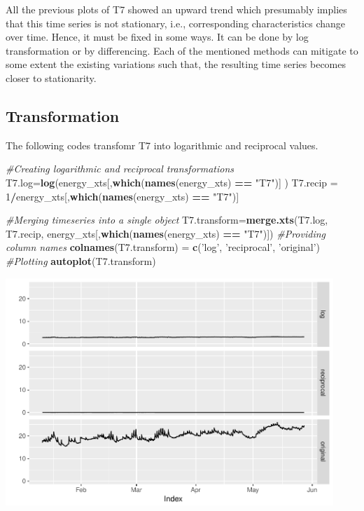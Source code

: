 \documentclass[]{article}
\newenvironment{Shaded}{\begin{snugshade}}{\end{snugshade}}
\newcommand{\KeywordTok}[1]{\textcolor[rgb]{0.13,0.29,0.53}{\textbf{#1}}}
\newcommand{\DecValTok}[1]{\textcolor[rgb]{0.00,0.00,0.81}{#1}}
\newcommand{\StringTok}[1]{\textcolor[rgb]{0.31,0.60,0.02}{#1}}
\newcommand{\CommentTok}[1]{\textcolor[rgb]{0.56,0.35,0.01}{\textit{#1}}}
\newcommand{\OperatorTok}[1]{\textcolor[rgb]{0.81,0.36,0.00}{\textbf{#1}}}
\newcommand{\NormalTok}[1]{#1}
\begin{document}
All the previous plots of T7 showed an upward trend which presumably
implies that this time series is not stationary, i.e., corresponding
characteristics change over time. Hence, it must be fixed in some ways.
It can be done by log transformation or by differencing. Each of the
mentioned methods can mitigate to some extent the existing variations
such that, the resulting time series becomes closer to stationarity.

\subsection{Transformation}\label{transformation}

The following codes transfomr T7 into logarithmic and reciprocal values.

\begin{Shaded}
\begin{Highlighting}[]
\CommentTok{#Creating logarithmic and reciprocal transformations}
\NormalTok{T7.log=}\KeywordTok{log}\NormalTok{(energy_xts[,}\KeywordTok{which}\NormalTok{(}\KeywordTok{names}\NormalTok{(energy_xts) }\OperatorTok{==}\StringTok{ "T7"}\NormalTok{)] )}
\NormalTok{T7.recip =}\StringTok{ }\DecValTok{1}\OperatorTok{/}\NormalTok{energy_xts[,}\KeywordTok{which}\NormalTok{(}\KeywordTok{names}\NormalTok{(energy_xts) }\OperatorTok{==}\StringTok{ "T7"}\NormalTok{)]}

\CommentTok{#Merging timeseries into a single object}
\NormalTok{T7.transform=}\KeywordTok{merge.xts}\NormalTok{(T7.log, T7.recip, energy_xts[,}\KeywordTok{which}\NormalTok{(}\KeywordTok{names}\NormalTok{(energy_xts) }\OperatorTok{==}\StringTok{ "T7"}\NormalTok{)])}
\CommentTok{#Providing column names}
\KeywordTok{colnames}\NormalTok{(T7.transform) =}\StringTok{ }\KeywordTok{c}\NormalTok{(}\StringTok{'log'}\NormalTok{, }\StringTok{'reciprocal'}\NormalTok{, }\StringTok{'original'}\NormalTok{)}
\CommentTok{#Plotting}
\KeywordTok{autoplot}\NormalTok{(T7.transform)}
\end{Highlighting}
\end{Shaded}

\includegraphics[width=468]{README_figs/README-unnamed-chunk-10-1}
\end{document}
